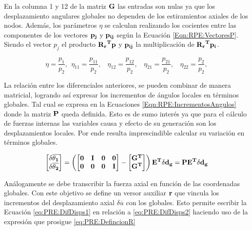 En la columna 1 y 12 de la matriz $\bf{G}$ las entradas son nulas ya que los desplazamiento angulares globales no dependen de los estiramientos axiales de los nodos. Además, los parámetros $\eta$ se calculan realizando 
los cocientes entre las componentes de los vectores $\bf{p}_j$ y $\bf{p_{ij}}$ según la Ecuación \eqref{Eqn:RPE:VectoresP}. Siendo el vector $p_j$ el producto $\bf{R_r}^T\bf{p}$ y $\bf{p_{ij}}$ la multiplicación de $\bf{R_r}^T\bf{p}_i$. 

\begin{equation}\label{Eqn:RPE:VectoresP}
	\eta = \frac{p_1}{p_2}, ~~\eta_{11} = \frac{p_{11}}{p_2}, ~~~~\eta_{12} = \frac{p_{12}}{p_2}, ~~~~\eta_{21} = \frac{p_{21}}{p_2}, ~~~~\eta_{22} = \frac{p_{2}}{p_2}, 
\end{equation}


La relación entre los diferenciales anteriores, se pueden combinar de manera matricial, logrando así expresar los incrementos de ángulos locales en términos globales. Tal cual se expresa en la Ecuaciones \eqref{Eqn:RPE:IncrementosAngulos} donde la matriz $\bf{P}$ queda definida. Esto es de sumo interés ya que para el cálculo de fuerzas internas las variables causa y efecto de su generación son los desplazamientos locales. Por ende resulta imprescindible calcular su variación en términos globales. 


\begin{equation}\label{Eqn:RPE:IncrementosAngulos}
	\begin{bmatrix}
		\bf{\delta\overline{\theta_1}}\\ 
		\bf{\delta\overline{\theta_2}}
	\end{bmatrix}=\left ( \begin{bmatrix}
		\bf{0} &\bf{I}  & \bf{0} &\bf{0} \\ 
		\bf{0}&\bf{0}  &\bf{0}  & \bf{I}
	\end{bmatrix}-\begin{bmatrix}
		\bf{G}^T\\ 
		\bf{G}^T
	\end{bmatrix} \right )\bf{E}^T \delta \bf{d_g}=\bf{P}\bf{E}^T \delta \bf{d_g}
\end{equation}

Análogamente se debe transcribir la fuerza axial en función de las coordenadas globales. Con este objetivo se define un versor auxiliar  $ \bf{r}$ que vincula los incrementos del desplazamiento axial $\delta \overline{u}$ con los globales. Esto permite escribir la Ecuación \eqref{eq:PRE:DifDisps1} en relación a  \eqref{eq:PRE:DifDisps2} haciendo uso de la expresión que prosigue \eqref{eq:PRE:DefincionR}

